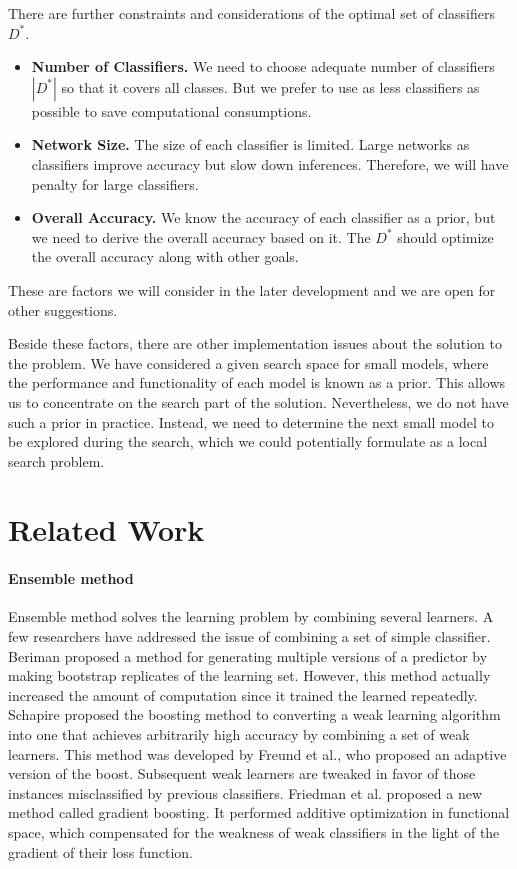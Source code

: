 \documentclass[acmsmall,nonacm]{acmart}\settopmatter{}
\begin{document}
There are further constraints and considerations of the optimal set of classifiers $D^*$.
\begin{itemize}
    \item \textbf{Number of Classifiers.} We need to choose adequate number of classifiers $|D^*|$ so that it covers all classes. But we prefer to use as less classifiers as possible to save computational consumptions.
    \item \textbf{Network Size.} The size of each classifier is limited. Large networks as classifiers improve accuracy but slow down inferences. Therefore, we will have penalty for large classifiers.
    \item \textbf{Overall Accuracy.} We know the accuracy of each classifier as a prior, but we need to derive the overall accuracy based on it. The $D^*$ should optimize the overall accuracy along with other goals.
\end{itemize}
These are factors we will consider in the later development and we are open for other suggestions.

Beside these factors, there are other implementation issues about the solution to the problem.
We have considered a given search space for small models, where the performance and functionality of each model is known as a prior.
This allows us to concentrate on the search part of the solution.
Nevertheless, we do not have such a prior in practice.
Instead, we need to determine the next small model to be explored during the search, which we could potentially formulate as a local search problem.

\section{Related Work}
\paragraph{\textbf{Ensemble method}} 
Ensemble method solves the learning problem by combining several learners.
A few researchers have addressed the issue of combining a set of simple classifier. 
Beriman\cite{BreimanBagging} proposed a method for generating multiple versions of a predictor by making bootstrap replicates of the learning set. 
However, this method actually increased the amount of computation since it trained the learned repeatedly.
Schapire\cite{Schapire1989The} proposed the boosting method to converting a weak learning algorithm into one that achieves arbitrarily high accuracy by combining a set of weak learners.
This method was developed by Freund et al.\cite{Freund1995A}, who proposed an adaptive version of the boost.
Subsequent weak learners are tweaked in favor of those instances misclassified by previous classifiers. 
Friedman et al.\cite{FriedmanGreedy} proposed a new method called gradient boosting. 
It performed additive optimization in functional space, which compensated for the weakness of weak classifiers in the light of the gradient of their loss function.



% 





\end{document}
